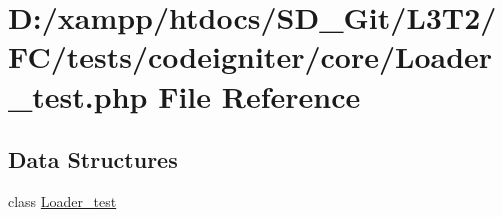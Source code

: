 \hypertarget{_loader__test_8php}{}\section{D\+:/xampp/htdocs/\+S\+D\+\_\+\+Git/\+L3\+T2/\+F\+C/tests/codeigniter/core/\+Loader\+\_\+test.php File Reference}
\label{_loader__test_8php}
\subsection*{Data Structures}
\begin{DoxyCompactItemize}
\item 
class \hyperlink{class_loader__test}{Loader\+\_\+test}
\end{DoxyCompactItemize}

